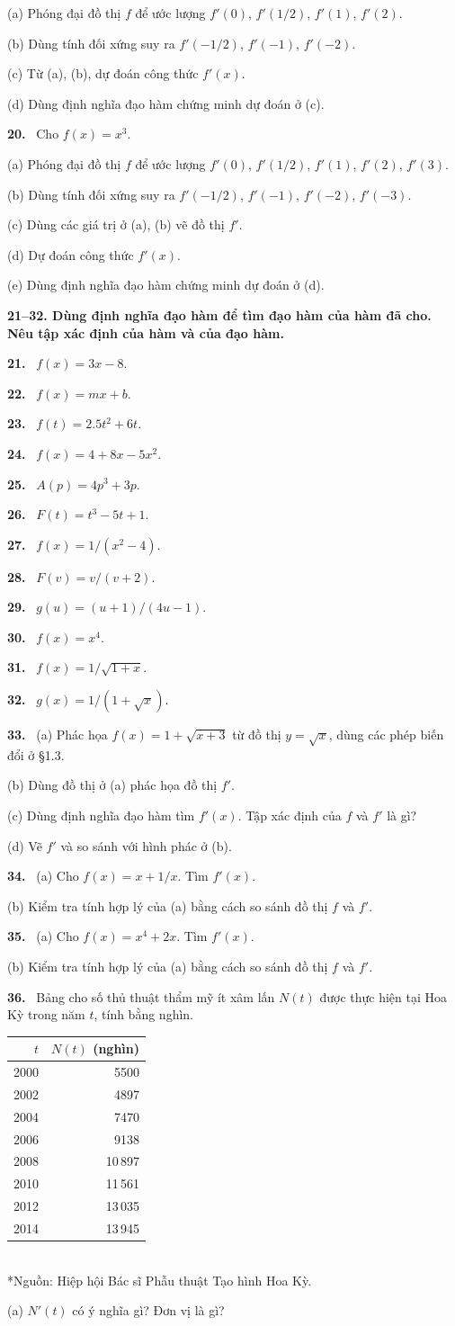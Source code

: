 \documentclass[12pt,a4paper]{article}
\newcommand{\bt}[1]{\par\smallskip\noindent\textbf{#1.}\ }
\newcommand{\group}[1]{\par\medskip\noindent\textbf{#1}\par\nopagebreak[4]}
\begin{document}
(a) Phóng đại đồ thị $f$ để ước lượng $f'(0)$, $f'(1/2)$, $f'(1)$, $f'(2)$.

(b) Dùng tính đối xứng suy ra $f'(-1/2)$, $f'(-1)$, $f'(-2)$.

(c) Từ (a), (b), dự đoán công thức $f'(x)$.

(d) Dùng định nghĩa đạo hàm chứng minh dự đoán ở (c).
\bt{20} Cho $f(x)=x^3$.

(a) Phóng đại đồ thị $f$ để ước lượng $f'(0)$, $f'(1/2)$, $f'(1)$, $f'(2)$, $f'(3)$.

(b) Dùng tính đối xứng suy ra $f'(-1/2)$, $f'(-1)$, $f'(-2)$, $f'(-3)$.

(c) Dùng các giá trị ở (a), (b) vẽ đồ thị $f'$.

(d) Dự đoán công thức $f'(x)$.

(e) Dùng định nghĩa đạo hàm chứng minh dự đoán ở (d).
\group{21–32. Dùng định nghĩa đạo hàm để tìm đạo hàm của hàm đã cho. Nêu tập xác định của hàm và của đạo hàm.}
\bt{21} $f(x)=3x-8$.
\bt{22} $f(x)=mx+b$.
\bt{23} $f(t)=2.5t^2+6t$.
\bt{24} $f(x)=4+8x-5x^2$.
\bt{25} $A(p)=4p^3+3p$.
\bt{26} $F(t)=t^3-5t+1$.
\bt{27} $f(x)=1/(x^2-4)$.
\bt{28} $F(v)=v/(v+2)$.
\bt{29} $g(u)=(u+1)/(4u-1)$.
\bt{30} $f(x)=x^4$.
\bt{31} $f(x)=1/\sqrt{1+x}$.
\bt{32} $g(x)=1/(1+\sqrt{x})$.
\bt{33} (a) Phác họa $f(x)=1+\sqrt{x+3}$ từ đồ thị $y=\sqrt{x}$, dùng các phép biến đổi ở §1.3.

(b) Dùng đồ thị ở (a) phác họa đồ thị $f'$.

(c) Dùng định nghĩa đạo hàm tìm $f'(x)$. Tập xác định của $f$ và $f'$ là gì?

(d) Vẽ $f'$ và so sánh với hình phác ở (b).
\bt{34} (a) Cho $f(x)=x+1/x$. Tìm $f'(x)$.

(b) Kiểm tra tính hợp lý của (a) bằng cách so sánh đồ thị $f$ và $f'$.
\bt{35} (a) Cho $f(x)=x^4+2x$. Tìm $f'(x)$.

(b) Kiểm tra tính hợp lý của (a) bằng cách so sánh đồ thị $f$ và $f'$.
\bt{36} Bảng cho số thủ thuật thẩm mỹ ít xâm lấn $N(t)$ được thực hiện tại Hoa Kỳ trong năm $t$, tính bằng nghìn.
\begin{center}\begin{tabular}{rr}\toprule$t$&$N(t)$ (nghìn)\\\midrule
2000&5500\\2002&4897\\2004&7470\\2006&9138\\2008&10\,897\\2010&11\,561\\2012&13\,035\\2014&13\,945\\\bottomrule
\end{tabular}\\*{\small Nguồn: Hiệp hội Bác sĩ Phẫu thuật Tạo hình Hoa Kỳ.}\end{center}
(a) $N'(t)$ có ý nghĩa gì? Đơn vị là gì?
\end{document}
